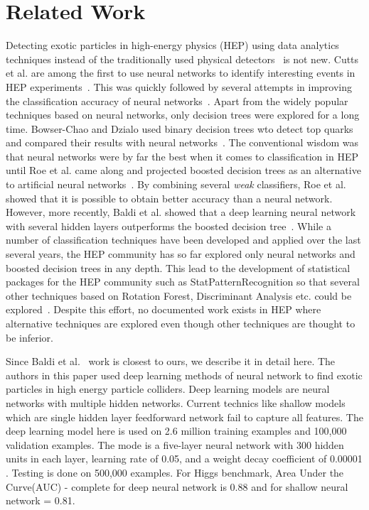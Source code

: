 \section{Related Work}
\label{sec:related}

Detecting exotic particles in high-energy physics (HEP) using data analytics techniques instead of the traditionally used physical detectors~\cite{detectors} is not new. Cutts et al. are among the first to use neural networks to identify interesting events in HEP experiments~\cite{Cutts-NN1}. This was quickly followed by several attempts in improving the classification accuracy of neural networks~\cite{NN2,NN3}. Apart from the widely popular techniques based on neural networks, only decision trees were explored for a long time. Bowser-Chao and Dzialo used binary decision trees wto detect top quarks and compared their results with neural networks~\cite{Binary-DT}. The conventional wisdom was that neural networks were by far the best when it comes to classification in HEP until Roe et al. came along and projected boosted decision trees as an alternative to artificial neural networks~\cite{Boosted-DT}. By combining several \emph{weak} classifiers, Roe et al. showed that it is possible to obtain better accuracy than a neural network. However, more recently, Baldi et al. showed that a deep learning neural network with several hidden layers outperforms the boosted decision tree~\cite{DeepNN}. While a number of classification techniques have been developed and applied over the last several years, the HEP community has so far explored only neural networks and boosted decision trees in any depth. This lead to the development of statistical packages for the HEP community such as StatPatternRecognition so that several other techniques based on Rotation Forest, Discriminant Analysis etc. could be explored~\cite{StatPatternRecognition}. Despite this effort, no documented work exists in HEP where alternative techniques are explored even though other techniques are thought to be inferior.

Since Baldi et al.~\cite{DeepNN} work is closest to ours, we describe it in detail here. The authors in this paper used deep learning methods of neural network to find exotic particles in high energy particle colliders. Deep learning models are neural networks with multiple hidden networks. Current technics like shallow models which are single hidden layer feedforward network fail to capture all features.
The deep learning model here is used on 2.6 million training examples and 100,000 validation examples. The mode is a five-layer neural network with 300 hidden units in each layer, learning rate of 0.05, and a weight decay coefficient of 0.00001 . Testing is done on 500,000 examples. For Higgs benchmark, Area Under the Curve(AUC) - complete for deep neural network is 0.88 and for shallow neural network = 0.81.
